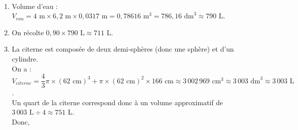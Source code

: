 \ \\ [-5mm]
\begin{enumerate}
   \item Volume d'eau : $V_{eau} =4\text{ m}\times6,2\text{ m}\times0,0317\text{ m} =0,78616\text{ m}^3 =786,16\text{ dm}^3 \approx 790\text{ L}$. \\
   \item On récolte $0,90\times790\text{ L} \approx711\text{ L}$. \\
   \item La citerne est composée de deux demi-sphères (donc une sphère) et d'un cylindre. \\
   On a : $V_{citerne} = \dfrac43\pi\times(62\text{ cm})^3+\pi\times(62\text{ cm})^2\times166\text{ cm} \approx 3\,002\,969 \text{ cm}^3 \approx 3\,003\text{ dm}^3 \approx 3\,003\text{ L}$. \\ [1mm]
   Un quart de la citerne correspond donc à un volume approximatif de $3\,003\text{ L}\div4 \approx751\text{ L}$. \\
   Donc, 
\end{enumerate}
